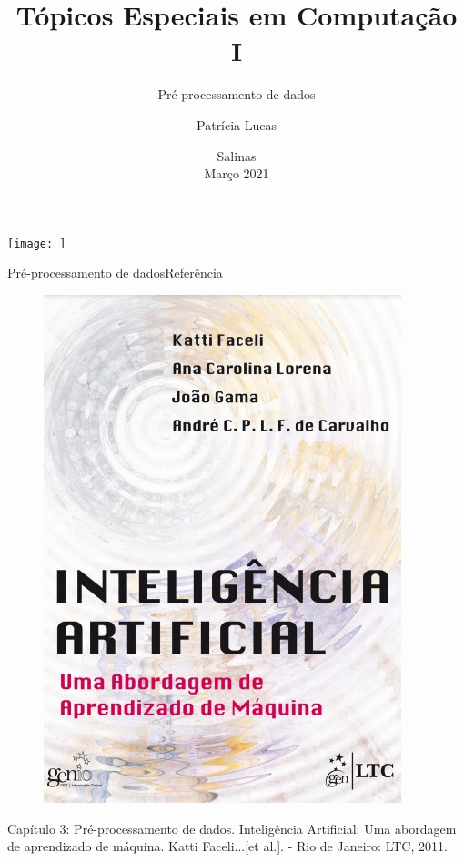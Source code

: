 \documentclass[t]{beamer}
\title[]{Tópicos Especiais em Computação I}
\subtitle[]{Pré-processamento de dados}
\author[]{Patrícia Lucas\\{\footnotesize }}
\institute{Bacharelado em Sistemas de Informação \\ IFNMG  - Campus Salinas}
\date{\scriptsize Salinas\\Março 2021}
\begin{document}
\begin{frame}

\begin{center}
\texttt{[image: ]}
\end{center}
  \titlepage
\end{frame}

\begin{ftst}{Pré-processamento de dados}{Referência}

\begin{figure}
    \includegraphics[scale=0.35]{Figuras/slide01_11.jpg}
\end{figure}
Capítulo 3: Pré-processamento de dados.
\vone
\scriptsize
Inteligência Artificial: Uma abordagem de aprendizado de máquina. Katti Faceli...[et al.]. - Rio de Janeiro: LTC, 2011.

\end{ftst}
\end{document}
